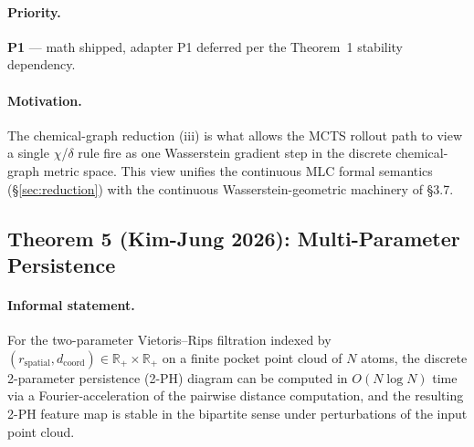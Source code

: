 \paragraph{Priority.}
\textbf{P1} --- math shipped, adapter P1 deferred per the Theorem~1
stability dependency.

\paragraph{Motivation.}
The chemical-graph reduction (iii) is what allows the MCTS rollout
path to view a single $\chi$/$\delta$ rule fire as one Wasserstein
gradient step in the discrete chemical-graph metric space.  This
view unifies the continuous MLC formal semantics
(§\ref{sec:reduction}) with the continuous Wasserstein-geometric
machinery of §3.7.

\subsection{Theorem 5 (Kim-Jung 2026): Multi-Parameter Persistence}
\label{sec:math:T5}

\paragraph{Informal statement.}
For the two-parameter Vietoris--Rips filtration indexed by
$(r_{\mathrm{spatial}}, d_{\mathrm{coord}}) \in \mathbb{R}_+ \times
\mathbb{R}_+$ on a finite pocket point cloud of $N$ atoms, the
discrete 2-parameter persistence (2-PH) diagram can be computed in
$O(N \log N)$ time via a Fourier-acceleration of the pairwise
distance computation, and the resulting 2-PH feature map is stable
in the bipartite sense under perturbations of the input point cloud.

